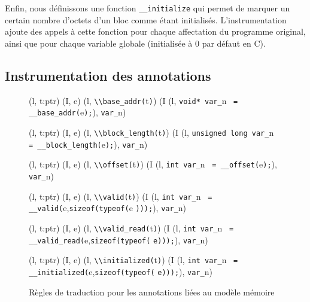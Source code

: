 Enfin, nous définissons une fonction \lstinline'__initialize' qui permet de
marquer un certain nombre d'octets d'un bloc comme étant initialisés.
L'instrumentation ajoute des appels à cette fonction pour chaque affectation du
programme original, ainsi que pour chaque variable globale (initialisée à 0 par
défaut en C).


\subsection{Instrumentation des annotations}


\begin{figure*}[b!]
  \scriptsize{
    {
      {(l, t:ptr) \trule (I, e) }
      {(l, \mbox{\lstinline'\\base_addr('}t\mbox{\lstinline')'}) \trule
        (I \concat
        (l, \mbox{\lstinline'void* var_'}n~
        \mbox{\lstinline'= __base_addr('}e\mbox{\lstinline');'}),
        \mbox{\lstinline'var_'}n)
      }{}
    }

    {
      {(l, t:ptr) \trule (I, e) }
      {(l, \mbox{\lstinline'\\block_length('}t\mbox{\lstinline')'}) \trule
        (I \concat
        (l, \mbox{\lstinline'unsigned long var_'}n~
        \mbox{\lstinline'= __block_length('}e\mbox{\lstinline');'}),
        \mbox{\lstinline'var_'}n)
      }{}
    }

    {
      {(l, t:ptr) \trule (I, e) }
      {(l, \mbox{\lstinline'\\offset('}t\mbox{\lstinline')'}) \trule
        (I \concat
        (l, \mbox{\lstinline'int var_'}n~
        \mbox{\lstinline'= __offset('}e\mbox{\lstinline');'}),
        \mbox{\lstinline'var_'}n)
      }{}
    }

    {
      {(l, t:ptr) \trule (I, e) }
      {(l, \mbox{\lstinline'\\valid('}t\mbox{\lstinline')'}) \prule
        (I \concat
        (l, \mbox{\lstinline'int var_'}n~
        \mbox{\lstinline'= __valid('}e,\mbox{\lstinline'sizeof(typeof('}e
        \mbox{\lstinline')));'}),
        \mbox{\lstinline'var_'}n)
      }{}
    }

    {
      {(l, t:ptr) \trule (I, e) }
      {(l, \mbox{\lstinline'\\valid_read('}t\mbox{\lstinline')'}) \prule
        (I \concat
        (l, \mbox{\lstinline'int var_'}n~
        \mbox{\lstinline'= __valid_read('}e,\mbox{\lstinline'sizeof(typeof('}
        \mbox{\lstinline'e)));'}),
        \mbox{\lstinline'var_'}n)
      }{}
    }

    {
      {(l, t:ptr) \trule (I, e) }
      {(l, \mbox{\lstinline'\\initialized('}t\mbox{\lstinline')'}) \prule
        (I \concat
        (l, \mbox{\lstinline'int var_'}n~
        \mbox{\lstinline'= __initialized('}e,\mbox{\lstinline'sizeof(typeof('}
        \mbox{\lstinline'e)));'}),
        \mbox{\lstinline'var_'}n)
      }{}
    }
  }
  \caption{Règles de traduction pour les annotations liées au modèle mémoire}
  \label{fig:mem-annots-rules}
\end{figure*}


